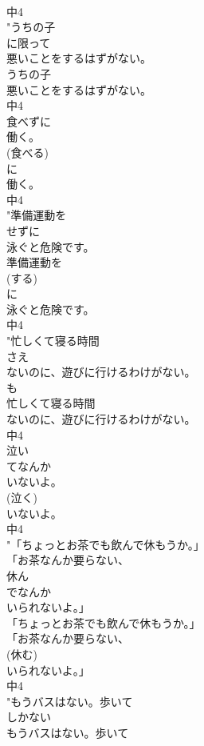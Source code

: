 \documentclass[8pt]{extreport}
\begin{document}
\begin{CJK}{UTF8}{min}
\\	中4
\\	"うちの子
\\	に限って
\\	悪いことをするはずがない。
\\	うちの子
\\	悪いことをするはずがない。
\\	中4
\\	食べずに
\\	働く。
\\	(食べる)
\\	に
\\	働く。
\\	中4
\\	"準備運動を
\\	せずに
\\	泳ぐと危険です。
\\	準備運動を
\\	(する)
\\	に
\\	泳ぐと危険です。
\\	中4
\\	"忙しくて寝る時間
\\	さえ
\\	ないのに、遊びに行けるわけがない。
\\	も 
\\	忙しくて寝る時間
\\	ないのに、遊びに行けるわけがない。
\\	中4
\\	泣い
\\	てなんか
\\	いないよ。
\\	(泣く)
\\	いないよ。
\\	中4
\\	"「ちょっとお茶でも飲んで休もうか。」
\\	「お茶なんか要らない、
\\	休ん
\\	でなんか
\\	いられないよ。」
\\	「ちょっとお茶でも飲んで休もうか。」
\\	「お茶なんか要らない、
\\	(休む)
\\	いられないよ。」
\\	中4
\\	"もうバスはない。歩いて
\\	しかない
\\	もうバスはない。歩いて

\end{CJK}
\end{document}

